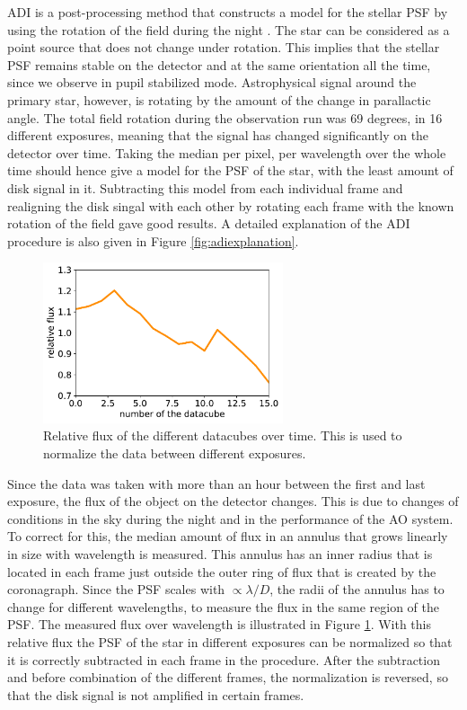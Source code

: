 \documentclass[twoside,single,12pt]{lion-msc}
\begin{document}
ADI is a post-processing method that constructs a model for the stellar PSF by using the rotation of the field during the night \cite{Marois2006}. The star can be considered as a point source that does not change under rotation. This implies that the stellar PSF remains stable on the detector and at the same orientation all the time, since we observe in pupil stabilized mode. Astrophysical signal around the primary star, however, is rotating by the amount of the change in parallactic angle. The total field rotation during the observation run was 69 degrees, in 16 different exposures, meaning that the signal has changed significantly on the detector over time. Taking the median per pixel, per wavelength over the whole time should hence give a model for the PSF of the star, with the least amount of disk signal in it. Subtracting this model from each individual frame and realigning the disk singal with each other by rotating each frame with the known rotation of the field gave good results. A detailed explanation of the ADI procedure is also given in Figure \ref{fig:adiexplanation}.
\bigskip

\begin{figure}
\centering
\vspace{-7mm}
\includegraphics[width = 0.63\textwidth]{aonorm}
\caption{Relative flux of the different datacubes over time. This is used to normalize the data between different exposures.}
\label{fig:aonorm}
\vspace{-5mm}
\end{figure}

Since the data was taken with more than an hour between the first and last exposure, the flux of the object on the detector changes. This is due to changes of conditions in the sky during the night and in the performance of the AO system. To correct for this, the median amount of flux in an annulus that grows linearly in size with wavelength is measured. This annulus has an inner radius that is located in each frame just outside the outer ring of flux that is created by the coronagraph. Since the PSF scales with $ \propto\lambda/D$, the radii of the annulus has to change for different wavelengths, to measure the flux in the same region of the PSF. The measured flux over wavelength is illustrated in Figure \ref{fig:aonorm}. With this relative flux the PSF of the star in different exposures can be normalized so that it is correctly subtracted in each frame in the procedure. After the subtraction and before combination of the different frames, the normalization is reversed, so that the disk signal is not amplified in certain frames.
\end{document}
